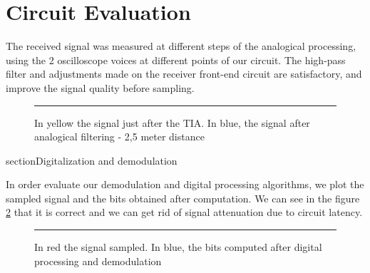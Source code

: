 \section{Circuit Evaluation}

The received signal was measured at different steps of the analogical processing, using the 2 oscilloscope voices at different points of our circuit. The high-pass filter and adjustments made on the receiver front-end circuit are satisfactory, and improve the signal quality before sampling.

\begin{figure}[htbp]
	\centering
		\rule{35em}{0.5pt}
		\caption[In yellow the signal just after the TIA. In blue, the signal after analogical filtering - 2,5 meter distance]{In yellow the signal just after the TIA. In blue, the signal after analogical filtering - 2,5 meter distance}
		\label{fig:circuit-compare}
	\end{figure}
	
section{Digitalization and demodulation}

In order evaluate our demodulation and digital processing algorithms, we plot the sampled signal and the bits obtained after computation. We can see in the figure \ref{fig:numeric} that it is correct and we can get rid of signal attenuation due to circuit latency.
\begin{figure}[htbp]
	\centering
		\rule{35em}{0.5pt}
		\caption{In red the signal sampled. In blue, the bits computed after digital processing and demodulation}
		\label{fig:numeric}
	\end{figure}

